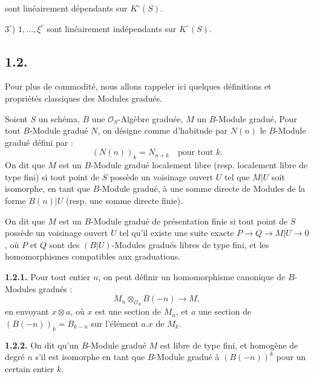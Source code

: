 sont linéairement dépendants sur \(K^\circ(S)\).

\(3^\circ\)) \(1,\ldots,\xi^r\) sont linéairement indépendants sur \(K^\circ(S)\).

\subsection*{1.2.}
Pour plus de commodité, nous allons rappeler ici quelques définitions et propriétés classiques des Modules gradués.

Soient \(S\) un schéma, \(B\) une \(\mathcal O_S\)-Algèbre graduée, \(M\) un \(B\)-Module gradué, Pour tout \(B\)-Module gradué \(N\), on désigne comme d'habitude par \(N(n)\) le \(B\)-Module gradué défini par :
\[
  (N(n))_k=N_{n+k}\quad\text{pour tout }k.
\]
On dit que \(M\) est un \(B\)-Module gradué localement libre (resp. localement libre de type fini) si tout point de \(S\) possède un voisinage ouvert \(U\) tel que \(M|U\) soit isomorphe, en tant que \(B\)-Module gradué, à une somme directe de Modules de la forme \(B(n)|U\) (resp. une somme directe finie).

On dit que \(M\) est un \(B\)-Module gradué de présentation finie si tout point de \(S\) possède un voisinage ouvert \(U\) tel qu'il existe une suite exacte \(P\longrightarrow Q\longrightarrow M|U\longrightarrow 0\), où \(P\) et \(Q\) sont des \((B|U)\)-Modules gradués libres de type fini, et les homomorphismes compatibles aux graduations.

\textbf{1.2.1.} Pour tout entier \(n\), on peut définir un homomorphisme canonique de \(B\)-Modules gradués :
\begin{equation}\tag{1.2.1}
  M_n\otimes_{\mathcal O_S} B(-n)\longrightarrow M,
\end{equation}
en envoyant \(x\otimes a\), où \(x\) est une section de \(M_n\), et \(a\) une section de \((B(-n))_k=B_{k-n}\) sur l'élément \(a.x\) de \(M_k\).

\textbf{1.2.2.} On dit qu'un \(B\)-Module gradué \(M\) est libre de type fini, et homogène de degré \(n\) s'il est isomorphe en tant que \(B\)-Module gradué à \((B(-n))^k\) pour un certain entier \(k\).

